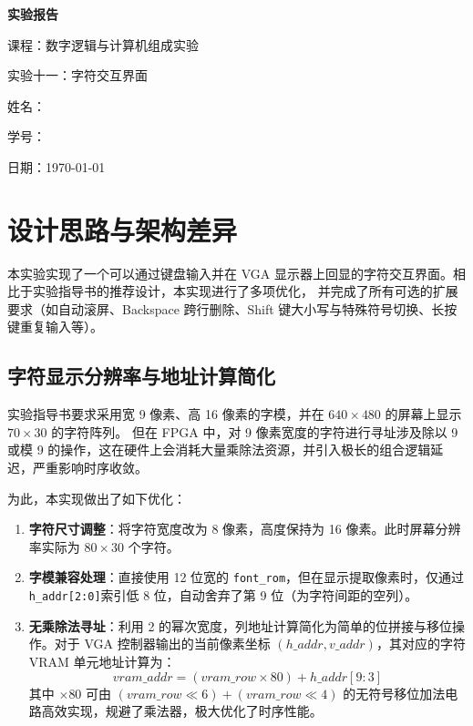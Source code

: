 \documentclass[12pt, a4paper]{ctexart}
\begin{document}
\begin{titlepage}
    \centering
    \vspace*{5cm}
    {\Huge\bfseries 实验报告\par}
    \vspace{2cm}
    {\Large 课程：数字逻辑与计算机组成实验\par}
    \vspace{1cm}
    {\Large 实验十一：字符交互界面\par}
    \vspace{4cm}
    {\large 姓名：\underline{}\par}
    \vspace{1cm}
    {\large 学号：\underline{}\par}
    \vspace{1cm}
    {\large 日期：\today\par}
\end{titlepage}

\tableofcontents
\newpage

\section{设计思路与架构差异}

本实验实现了一个可以通过键盘输入并在 VGA 显示器上回显的字符交互界面。相比于实验指导书的推荐设计，本实现进行了多项优化，
并完成了所有可选的扩展要求（如自动滚屏、Backspace 跨行删除、Shift 键大小写与特殊符号切换、长按键重复输入等）。

\subsection{字符显示分辨率与地址计算简化}

实验指导书要求采用宽 9 像素、高 16 像素的字模，并在 $640 \times 480$ 的屏幕上显示 $70 \times 30$ 的字符阵列。
但在 FPGA 中，对 9 像素宽度的字符进行寻址涉及除以 9 或模 9 的操作，这在硬件上会消耗大量乘除法资源，并引入极长的组合逻辑延迟，严重影响时序收敛。

为此，本实现做出了如下优化：
\begin{enumerate}
    \item \textbf{字符尺寸调整}：将字符宽度改为 8 像素，高度保持为 16 像素。此时屏幕分辨率实际为 $80 \times 30$ 个字符。
    \item \textbf{字模兼容处理}：直接使用 12 位宽的 \texttt{font\_rom}，但在显示提取像素时，仅通过 \texttt{h\_addr[2:0]}索引低 8 位，自动舍弃了第 9 位（为字符间距的空列）。
    \item \textbf{无乘除法寻址}：利用 2 的幂次宽度，列地址计算简化为简单的位拼接与移位操作。对于 VGA 控制器输出的当前像素坐标 $(h\_addr, v\_addr)$，其对应的字符 VRAM 单元地址计算为：
    \begin{equation}
        vram\_addr = (vram\_row \times 80) + h\_addr[9:3]
    \end{equation}
    其中 $\times 80$ 可由 $(vram\_row \ll 6) + (vram\_row \ll 4)$ 的无符号移位加法电路高效实现，规避了乘法器，极大优化了时序性能。
\end{enumerate}
\end{document}
